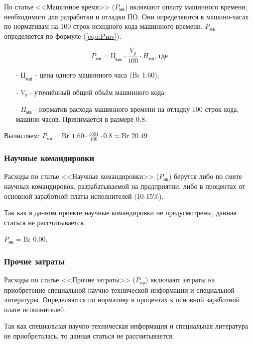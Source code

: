 По статье <<Машинное время>> ($P_\text{мв}$) включают оплату машинного времени, необходимого для разработки и отладки ПО.
Они определяются в машино-часах по нормативам на 100 строк исходного кода машинного времени.
$P_\text{мв}$ определяется по формуле (\ref{equ:Pmv}).

\begin{equation}
    \label{equ:Pmv}
    P_\text{мв} = \text{Ц}_\text{мвi} \cdot \frac{ V_y }{ 100 } \cdot H_\text{мв} \text{, где}
\end{equation}

\begin{enumerate}
    \item[-] $\text{Ц}_\text{мвi}$ - цена одного машинного часа (Br 1.60); 
    \item[-] $V_y$ - уточнённый общий объём машинного кода;
    \item[-] $H_\text{мв}$ - норматив расхода машинного времени на отладку 100 строк кода, машино-часов. Принимается в размере 0.8.
\end{enumerate}

Вычисляем: $P_\text{мв} = \text{Br } 1.60 \cdot \frac{ 1601 }{ 100 } \cdot 0.8 \approx \text{Br }20.49$

\subsubsection*{Научные командировки}

Расходы по статье <<Научные командировки>> ($P_\text{нк}$) берутся либо по смете научных командировок,
разрабатываемой на предприятии, либо в процентах от основной заработной платы исполнителей (10-15\%).

Так как в данном проекте научные командировки не предусмотрены, данная статься не рассчитывается. 

$P_\text{нк} = \text{Br }0.00$.

\subsubsection*{Прочие затраты}

Расходы по статье <<Прочие затраты>> ($P_\text{пр}$) включают затраты на приобретение специальной научно-технической информации и специальной литературы.
Определяются по нормативу в процентах к основной заработной плате исполнителей.

Так как специальная научно-техническая информация и специальная литература не приобреталась, то данная статься не рассчитывается.

